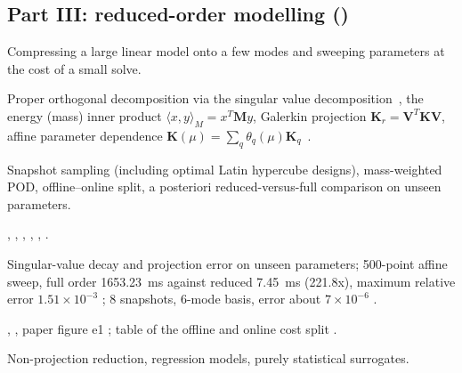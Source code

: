 \subsection*{Part III: reduced-order modelling (\rom{})}

\begin{description}[style=nextline,leftmargin=1em]
\item[Focus] Compressing a large linear model onto a few modes and sweeping parameters at the cost of a small solve.
\item[Mathematics] Proper orthogonal decomposition via the singular value decomposition~\cite{berkooz1993pod}, the energy (mass) inner product $\langle x,y\rangle_M=x^T\bm M y$, Galerkin projection $\bm K_r=\bm V^T\bm K\bm V$, affine parameter dependence $\bm K(\mu)=\sum_q\theta_q(\mu)\bm K_q$~\cite{hesthaven2016rb}.
\item[Algorithm] Snapshot sampling (including optimal Latin hypercube designs), mass-weighted POD, offline--online split, a posteriori reduced-versus-full comparison on unseen parameters.
\item[Implementation] , , , , , .
\item[Verification] Singular-value decay and projection error on unseen parameters; 500-point affine sweep, full order 1653.23~ms against reduced 7.45~ms (221.8x), maximum relative error $1.51\times10^{-3}$ \have{}; 8 snapshots, 6-mode basis, error about $7\times10^{-6}$ \have{}.
\item[Figures and tables] , , paper figure e1 \have{}; table of the offline and online cost split .
\item[Exclusions] Non-projection reduction, regression models, purely statistical surrogates.
\end{description}

